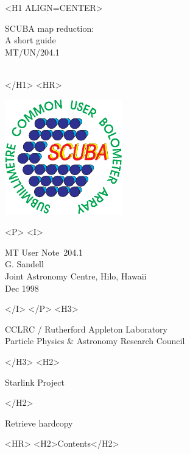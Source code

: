 \documentclass[twoside,11pt]{article}
\newcommand{\stardoccategory}  {MT User Note}
\newcommand{\stardocsource}    {MT/UN/\stardocnumber}
\newcommand{\stardocnumber}    {204.1}
\newcommand{\stardocauthors}   {G. Sandell \\ \jac}
\newcommand{\stardocdate}      {Dec 1998}
\newcommand{\stardoctitle}     {SCUBA map reduction:\\[2ex]
                                A short guide}
\newcommand{\stardocversion}   {MT/UN/204.1}
\newcommand{\stardocmanual}    {\ }
\newcommand{\jac}{\htmladdnormallink{Joint Astronomy Centre}{http://www.jach.hawaii.edu},
 Hilo, Hawaii}
\newcommand{\htmladdnormallink}[2]{#1}
\newcommand{\htmladdimg}[1]{}
\newcommand{\htmlref}[2]{#1}
\newcommand{\htmladdtonavigation}[1]{}
\newcommand{\xlabel}[1]{}
\renewcommand{\_}{\texttt{\symbol{95}}}
\begin{document}
\begin{htmlonly}
   \xlabel{}
   \begin{rawhtml} <H1 ALIGN=CENTER> \end{rawhtml}
      \stardoctitle\\
      \stardocversion\\
      \stardocmanual
   \begin{rawhtml} </H1> <HR> \end{rawhtml}

\includegraphics[width=2.0in]{sc11_logo.eps}

   \begin{rawhtml} <P> <I> \end{rawhtml}
   \stardoccategory\ \stardocnumber \\
   \stardocauthors \\
   \stardocdate
   \begin{rawhtml} </I> </P> <H3> \end{rawhtml}
      \htmladdnormallink{CCLRC}{http://www.cclrc.ac.uk} /
      \htmladdnormallink{Rutherford Appleton Laboratory}
                        {http://www.cclrc.ac.uk/ral} \\
      \htmladdnormallink{Particle Physics \& Astronomy Research Council}
                        {http://www.pparc.ac.uk} \\
   \begin{rawhtml} </H3> <H2> \end{rawhtml}
      \htmladdnormallink{Starlink Project}{http://star-www.rl.ac.uk/}
   \begin{rawhtml} </H2> \end{rawhtml}
   \htmladdnormallink{\htmladdimg{source.gif} Retrieve hardcopy}
      {http://star-www.rl.ac.uk/cgi-bin/hcserver?\stardocsource}\\

  \label{stardoccontents}
  \begin{rawhtml} 
    <HR>
    <H2>Contents</H2>
  \end{rawhtml}
  \htmladdtonavigation{\htmlref{\htmladdimg{contents_motif.gif}}
        {stardoccontents}}


\end{htmlonly}
\end{document}
